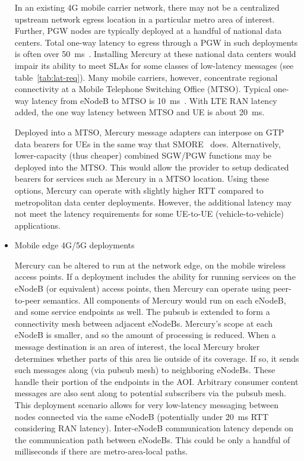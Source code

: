 \begin{itemize}
In an existing 4G mobile carrier network, there may not be a
centralized upstream network egress location in a particular metro
area of interest. Further, PGW nodes are typically deployed at a
handful of national data centers.  Total one-way latency to egress
through a PGW in such deployments is often over
50~ms~\cite{carrier-latency}. Installing Mercury at these national
data centers would impair its ability to meet SLAs for some classes of
low-latency messages (see table~\ref{tab:lat-req}). Many mobile
carriers, however, concentrate regional connectivity at a Mobile
Telephone Switching Office (MTSO).  Typical one-way latency from
eNodeB to MTSO is 10~ms~\cite{MTSO-latency}. With LTE RAN latency
added, the one way latency between MTSO and UE is about 20~ms.

Deployed into a MTSO, Mercury message adapters can interpose on GTP
data bearers for UEs in the same way that SMORE~\cite{SMORE}
does. Alternatively, lower-capacity (thus cheaper) combined SGW/PGW
functions may be deployed into the MTSO. This would allow the provider
to setup dedicated bearers for services such as Mercury in a MTSO
location.  Using these options, Mercury can operate with slightly
higher RTT compared to metropolitan data center deployments.  However,
the additional latency may not meet the latency requirements for some
UE-to-UE (vehicle-to-vehicle) applications.

\item Mobile edge 4G/5G deployments

Mercury can be altered to run at the network edge, on the mobile
wireless access points.  If a deployment includes the ability for
running services on the eNodeB (or equivalent) access points, then
Mercury can operate using peer-to-peer semantics.  All components of
Mercury would run on each eNodeB, and some service endpoints as
well. The pubsub is extended to form a connectivity mesh between
adjacent eNodeBs. Mercury's scope at each eNodeB is smaller, and so
the amount of processing is reduced. When a message destination is an
area of interest, the local Mercury broker determines whether parts of
this area lie outside of its coverage.  If so, it sends such messages
along (via pubsub mesh) to neighboring eNodeBs. These handle their
portion of the endpoints in the AOI.  Arbitrary consumer content
messages are also sent along to potential subscribers via the pubsub
mesh.  This deployment scenario allows for very low-latency messaging
between nodes connected via the same eNodeB (potentially under 20~ms
RTT considering RAN latency). Inter-eNodeB communication latency
depends on the communication path between eNodeBs.  This could be only
a handful of milliseconds if there are metro-area-local paths.


\end{itemize}
